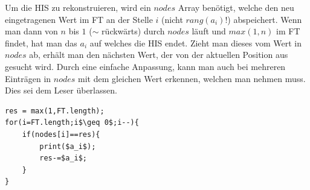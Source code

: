 Um die HIS zu rekonstruieren, wird ein $nodes$ Array benötigt, welche den neu eingetragenen Wert im FT an der Stelle $i$ (nicht $rang(a_i)$!) abspeichert. Wenn man dann von $n$ bis $1$ ($\sim$ rückwärts) durch $nodes$ läuft und $max(1,n)$ im FT findet, hat man das $a_i$ auf welches die HIS endet. Zieht man dieses vom Wert in $nodes$ ab, erhält man den nächsten Wert, der von der aktuellen Position aus gesucht wird. Durch eine einfache Anpassung, kann man auch bei mehreren Einträgen in $nodes$ mit dem gleichen Wert erkennen, welchen man nehmen muss. Dies sei dem Leser überlassen.

\begin{lstlisting}[mathescape]
res = max(1,FT.length);
for(i=FT.length;i$\geq 0$;i--){
	if(nodes[i]==res){
		print($a_i$);
		res-=$a_i$;
	}
}
\end{lstlisting}

